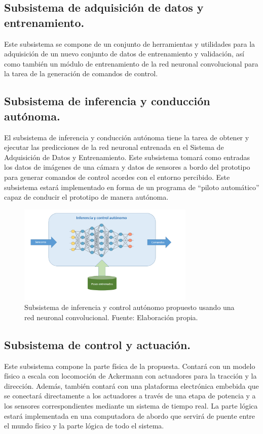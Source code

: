 \documentclass[12pt,letterpaper]{article}
\begin{document}
\subsection{Subsistema de adquisición de datos y entrenamiento.}
Este subsistema se compone de un conjunto de herramientas y utilidades para la 
adquisición de un nuevo conjunto de datos de entrenamiento y validación, así como
también un módulo de entrenamiento de la red neuronal convolucional para la tarea de
la generación de comandos de control.

\subsection{Subsistema de inferencia y conducción autónoma.}
El subsistema de inferencia y conducción autónoma tiene la tarea de obtener y ejecutar
las predicciones de la red neuronal entrenada en el Sistema de Adquisición de Datos y Entrenamiento.
Este subsistema tomará como entradas los datos de imágenes de una cámara y datos de 
sensores a bordo del prototipo para generar comandos de control acordes con el entorno
percibido. Este subsistema estará implementado en forma de un programa de ``piloto automático''
capaz de conducir el prototipo de manera autónoma.

\begin{figure}[!h] 
    \centering
    \includegraphics[width=0.75\textwidth]{img/nueva_inferencia}
    \caption{Subsistema de inferencia y control autónomo propuesto usando una red neuronal convolucional. Fuente: Elaboración propia.}
    \label{fig:nueva_inferencia}
\end{figure}


\subsection{Subsistema de control y actuación.}
Este subsistema compone la parte física de la propuesta. Contará con un modelo físico
a escala con locomoción de Ackermann con actuadores para la tracción y la dirección. 
Además, también contará con una plataforma electrónica embebida que se conectará 
directamente a los actuadores a través de una etapa de potencia y a los sensores 
correspondientes mediante un sistema de tiempo real. La parte lógica estará implementada
en una computadora de abordo que servirá de puente entre el mundo físico y la parte 
lógica de todo el sistema.
\end{document}
